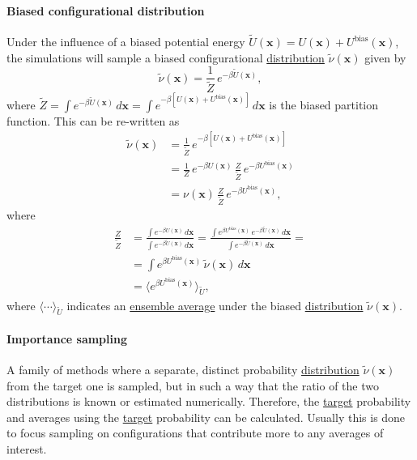 \documentclass[9pt,review]{livecoms}
\newcommand{\vx}{\mathbf{x}}
\begin{document}
\hypertarget{ref:BiasedDist} {\paragraph{Biased configurational distribution}}
Under the influence of a biased potential energy $\tilde{U}(\vx) =  U(\vx) + U^\mathrm{bias}(\vx)$, the simulations will sample a biased configurational \hyperlink{ref:Distribution} {distribution} $\tilde{\nu}(\vx)$ given by
\begin{equation}
\label{eq:biased_configurational distribution}
\tilde{\nu}(\vx) = \frac{1}{\tilde{Z}} \, e^{-\beta \tilde{U}(\vx)},
\end{equation}
where $\tilde{Z} = \int e^{-\beta \tilde{U}(\vx)} \, d\vx = \int e^{-\beta\left [ U(\vx) + U^\mathrm{bias}(\vx) \right]} \, d\vx$ is the biased partition function.
This can be re-written as
\begin{align}
\label{eq:biased_x_distribtion_rewritten}
\tilde{\nu}(\vx) & =
\frac{1}{\tilde{Z}} \, e^{-\beta\left [ U(\vx) + U^\mathrm{bias}(\vx) \right]}
\nonumber \\
& =
\frac{1}{Z} \, e^{-\beta U(\vx)} \, \frac{Z}{\tilde{Z}} \, e^{-\beta U^\mathrm{bias}(\vx)}
\nonumber \\
& =
\nu(\vx) \, \frac{Z}{\tilde{Z}} \, e^{-\beta U^\mathrm{bias}(\vx)},
\end{align}
where
\begin{align}
\label{eq:fraction_of_partition_functions}
\frac{Z}{\tilde{Z}} & =
\frac{\int e^{-\beta U(\vx)} \, d\vx} {\int e^{-\beta \tilde{U}(\vx)} \, d\vx} =
\frac{\int  e^{\beta U^\mathrm{bias}(\vx)} \, e^{-\beta \tilde{U}(\vx)} \, d\vx} {\int e^{-\beta \tilde{U}(\vx)} \, d\vx} =
\nonumber \\
& =
\int  e^{\beta U^\mathrm{bias}(\vx)} \, \tilde{\nu}(\vx) \, d\vx
\nonumber \\
& =
\langle e^{\beta U^\mathrm{bias}(\vx)} \rangle_{\tilde U},
\end{align}
where $\langle \cdots \rangle_{\tilde U}$ indicates an \hyperlink{ref:ensemble_average} {ensemble average} under the biased \hyperlink{ref:Distribution} {distribution} $\tilde{\nu}(\vx)$.


\hypertarget{ref:IS} {\paragraph{Importance sampling}}
\label{sec:importance_sampling} A family of methods where a separate, distinct probability \hyperlink{ref:Distribution} {distribution} $\tilde\nu(\vx)$ from the target one is sampled, but in such a way that the ratio of the two distributions is known or estimated numerically. Therefore, the \hyperlink{ref:targetdist} {target} probability and averages using the \hyperlink{ref:targetdist} {target} probability can be calculated.  Usually this is done to focus sampling on configurations that contribute more to any averages of interest.
\end{document}
